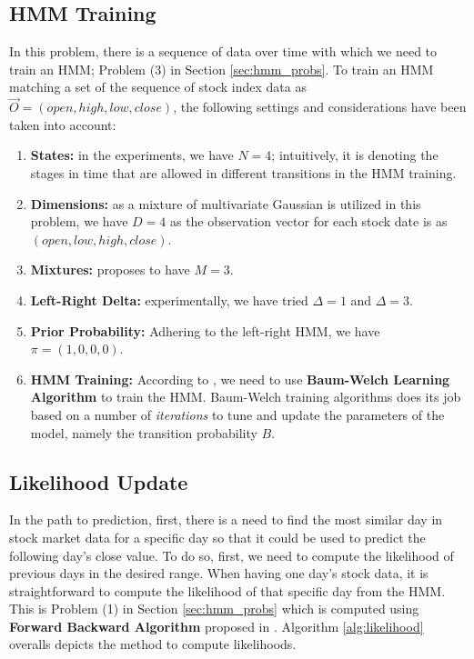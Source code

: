 \documentclass{acm_proc_article-sp}
\begin{document}
\subsection{HMM Training} \label{sec:train}
In this problem, there is a sequence of data over time with which we need to train an HMM; Problem (3) in Section
\ref{sec:hmm_probs}. To train an HMM matching a set of the sequence of stock index data as $\vec{O} = (open, high, low,
close)$, the following settings and considerations have been taken into account:
\begin{enumerate}
  \item \textbf{States:} in the experiments, we have $N = 4$; intuitively, it is denoting the stages in time that are
  allowed in different transitions in the HMM training.
  \item \textbf{Dimensions:} as a mixture of multivariate Gaussian is utilized in this problem, we have $D = 4$ as the
  observation vector for each stock date is as $(open, low, high, close)$.
  \item \textbf{Mixtures:} \cite{hassan:hmm_stock} proposes to have $M = 3$.
  \item \textbf{Left-Right Delta:} experimentally, we have tried $\Delta = 1$ and $\Delta = 3$.
  \item \textbf{Prior Probability:} Adhering to the left-right HMM, we have $\pi = (1, 0, 0, 0)$.
  \item \textbf{HMM Training:} According to \cite{hassan:hmm_stock,rabiner:hmm}, we need to use \textbf{Baum-Welch
  Learning Algorithm} to train the HMM. Baum-Welch training algorithms does its job based on a number of
  \textit{iterations} to tune and update the parameters of the model, namely the transition probability $B$.
\end{enumerate}

\subsection{Likelihood Update} \label{sec:likelihood}
In the path to prediction, first, there is a need to find the most similar day in stock market data for a specific day
so that it could be used to predict the following day's close value. To do so, first, we need to compute the
likelihood of previous days in the desired range. When having one day's stock data, it is straightforward to compute
the likelihood of that specific day from the HMM. This is Problem (1) in Section \ref{sec:hmm_probs} which is computed using
\textbf{Forward Backward Algorithm} proposed in \cite{rabiner:hmm,erwin:datamining,wiki:hmm}. Algorithm
\ref{alg:likelihood} overalls depicts the method to compute likelihoods.
\end{document}
